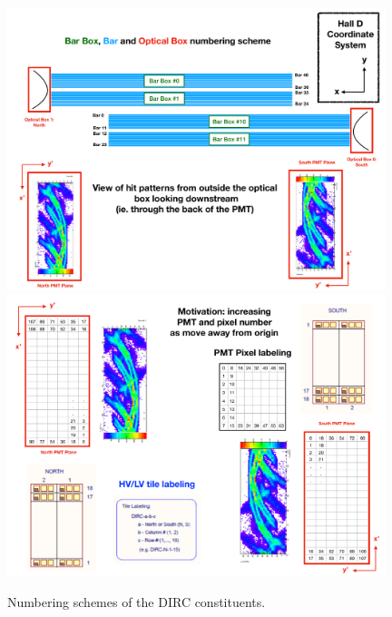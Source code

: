 \begin{figure}[!h]
\centering
\includegraphics[width=0.98\textwidth]{pics/DIRC_Geometry11.pdf}\\
\includegraphics[width=0.98\textwidth]{pics/DIRC_Geometry22.pdf}
\caption{\label{pic:dirc2}
Numbering schemes of the DIRC constituents.
}
\end{figure}

